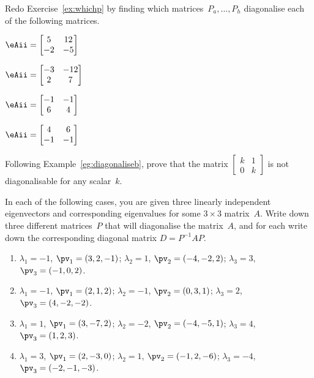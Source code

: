 \begin{exercise} \label{ex:whichps} 
Redo Exercise~\ref{ex:whichp} by finding which matrices~\(P_a,\ldots,P_h\) diagonalise each of the following matrices.
\begin{parts}
\item \(\eAii=\begin{bmatrix} 5&12\\-2&-5 \end{bmatrix}\)
\item \(\eAii=\begin{bmatrix} -3&-12\\2&7 \end{bmatrix}\)
\item \(\eAii=\begin{bmatrix} -1&-1\\6&4 \end{bmatrix}\)
\item \(\eAii=\begin{bmatrix} 4&6\\-1&-1 \end{bmatrix}\)
\end{parts}
\end{exercise}




\begin{exercise} \label{ex:} 
Following Example~\ref{eg:diagonaliseb}, prove that the matrix \(\begin{bmatrix} k&1\\0&k \end{bmatrix}\) is not diagonalisable for any scalar~\(k\).
\end{exercise}




\begin{exercise} \label{ex:} 
In each of the following cases, you are given three linearly independent eigenvectors and corresponding eigenvalues for some \(3\times3\) matrix~\(A\).
Write down three different matrices~\(P\) that will diagonalise the matrix~\(A\), and for each write down the corresponding diagonal matrix \(D=P^{-1}AP\).
\begin{enumerate}
\item \(\lambda_1=-1\), \(\pv_1=(3,2,-1)\);
\(\lambda_2=1\), \(\pv_2=(-4,-2,2)\);
\(\lambda_3=3\), \(\pv_3=(-1,0,2)\).

\item \(\lambda_1=-1\), \(\pv_1=( 2,1,2)\);
\(\lambda_2=-1\), \(\pv_2=(0,3,1)\);
\(\lambda_3=2\), \(\pv_3=(4,-2,-2)\).

\item \(\lambda_1=1\), \(\pv_1=(3,-7,2)\);
\(\lambda_2=-2\), \(\pv_2=(-4,-5,1)\);
\(\lambda_3=4\), \(\pv_3=(1,2,3)\).

\item \(\lambda_1=3\), \(\pv_1=(2,-3,0)\);
\(\lambda_2=1\), \(\pv_2=(-1,2,-6)\);
\(\lambda_3=-4\), \(\pv_3=(-2,-1,-3)\).

\end{enumerate}
\end{exercise}





